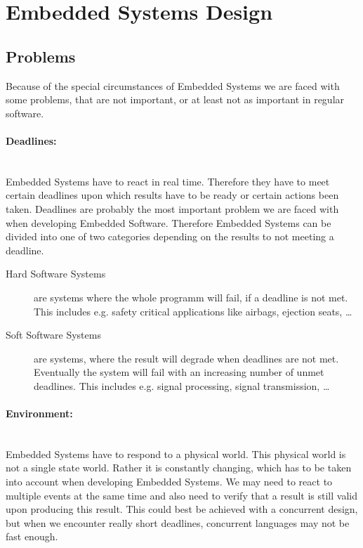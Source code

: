 \documentclass[10pt,a4paper,titlepage,draft]{article} %
\begin{document}
\section{Embedded Systems Design}
\subsection{Problems}
Because of the special circumstances of Embedded Systems we are faced with some problems, that are not important, or at least not as important in regular software.

\paragraph{Deadlines:} \ \\
Embedded Systems have to react in real time.
Therefore they have to meet certain deadlines upon which results have to be ready or certain actions been taken.
Deadlines are probably the most important problem we are faced with when developing Embedded Software.
Therefore Embedded Systems can be divided into one of two categories depending on the results to not meeting a deadline.

\begin{description}
	\item[Hard Software Systems] are systems where the whole programm will fail, if a deadline is not met.
	This includes e.g. safety critical applications like airbags, ejection seats, \dots
	\item[Soft Software Systems] are systems, where the result will degrade when deadlines are not met.
	Eventually the system will fail with an increasing number of unmet deadlines. This includes e.g. signal processing, signal transmission, \dots
\end{description}

\paragraph{Environment:} \ \\
Embedded Systems have to respond to a physical world. This physical world is not a single state world.
Rather it is constantly changing, which has to be taken into account when developing Embedded Systems.
We may need to react to multiple events at the same time and also need to verify that a result is still valid upon producing this result.
This could best be achieved with a concurrent design, but when we encounter really short deadlines, concurrent languages may not be fast enough.
\end{document}
